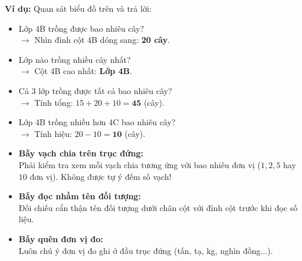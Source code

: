 \documentclass[14pt,a4paper,oneside]{extbook}
\begin{document}
\vspace{-2.5mm}
\noindent
\begin{minipage}[t]{0.49\textwidth}\vspace{0pt}
\begin{tcolorbox}[
  enhanced,
  colback=green!4!white,
  colframe=green!60!black,
  arc=2mm, boxrule=0.8pt,
  left=2mm, right=2mm, top=1.8mm, bottom=1.8mm,
  title={\footnotesize\bfseries\color{white}\faCheckCircle\ Ví dụ thực hành chuẩn mực}
]
{\footnotesize
\textbf{Ví dụ:} Quan sát biểu đồ trên và trả lời:
\begin{itemize}\setlength{\itemsep}{1pt}\setlength{\leftskip}{-2.5mm}
  \item Lớp 4B trồng được bao nhiêu cây?\\
  $\to$ Nhìn đỉnh cột 4B dóng sang: \textbf{20 cây}.
  \item Lớp nào trồng nhiều cây nhất?\\
  $\to$ Cột 4B cao nhất: \textbf{Lớp 4B}.
  \item Cả 3 lớp trồng được tất cả bao nhiêu cây?\\
  $\to$ Tính tổng: $15 + 20 + 10 = \mathbf{45}$ (cây).
  \item Lớp 4B trồng nhiều hơn 4C bao nhiêu cây?\\
  $\to$ Tính hiệu: $20 - 10 = \mathbf{10}$ (cây).
\end{itemize}
}
\end{tcolorbox}
\end{minipage}
\hfill
\begin{minipage}[t]{0.49\textwidth}\vspace{0pt}
\begin{tcolorbox}[
  enhanced,
  colback=red!4!white,
  colframe=red!70!black,
  arc=2mm, boxrule=0.8pt,
  left=2mm, right=2mm, top=1.8mm, bottom=1.8mm,
  title={\footnotesize\bfseries\color{white}\faExclamationTriangle\ Mẹo tránh bẫy trắc nghiệm}
]
{\footnotesize
\begin{itemize}\setlength{\itemsep}{1.5pt}\setlength{\leftskip}{-2.5mm}
  \item \textbf{Bẫy vạch chia trên trục đứng:}\\
  Phải kiểm tra xem mỗi vạch chia tương ứng với bao nhiêu đơn vị ($1, 2, 5$ hay $10$ đơn vị). Không được tự ý đếm số vạch!
  \item \textbf{Bẫy đọc nhầm tên đối tượng:}\\
  Đối chiếu cẩn thận tên đối tượng dưới chân cột với đỉnh cột trước khi đọc số liệu.
  \item \textbf{Bẫy quên đơn vị đo:}\\
  Luôn chú ý đơn vị đo ghi ở đầu trục đứng (tấn, tạ, kg, nghìn đồng...).
\end{itemize}
}
\end{tcolorbox}
\end{minipage}
\end{document}
